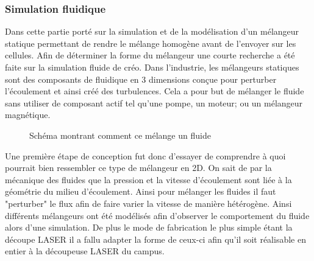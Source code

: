 \documentclass[a4paper, 11pt]{article}
\begin{document}
\subsubsection{Simulation fluidique}
Dans cette partie porté sur la simulation et de la modélisation d'un mélangeur statique
permettant de rendre le mélange homogène avant de l'envoyer sur les cellules.
Afin de déterminer la forme du mélangeur une courte recherche a été faite sur la simulation fluide de créo.
Dans l'industrie, les mélangeurs statiques sont des composants de fluidique en 3 dimensions conçue pour
perturber l'écoulement et ainsi créé des turbulences.
Cela a pour but de mélanger le fluide sans utiliser de composant actif tel qu'une pompe, un moteur;
ou un mélangeur magnétique.
\begin{figure}[H]
    \centering
    \caption{Schéma montrant comment ce mélange un fluide}
    \label{fig:simulation1}
\end{figure}
Une première étape de conception fut donc d'essayer de comprendre à quoi pourrait bien ressembler ce
type de mélangeur en 2D.
On sait de par la mécanique des fluides que la pression et la vitesse d'écoulement sont liée à la
géométrie du milieu d'écoulement. Ainsi pour mélanger les fluides il faut "perturber" le flux afin de faire
varier la vitesse de manière hétérogène.
Ainsi différents mélangeurs ont été modélisés afin d'observer le comportement du fluide alors
d'une simulation.
De plus le mode de fabrication le plus simple étant la découpe LASER il a fallu adapter la forme
de ceux-ci afin qu'il soit réalisable en entier à la découpeuse LASER du campus.
\end{document}
